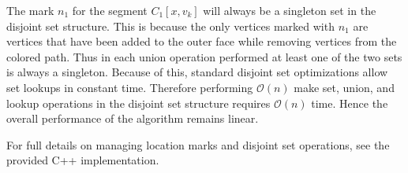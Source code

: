\documentclass[letterpaper, 12pt]{article}
\theoremstyle{definition}
\theoremstyle{definition}
\theoremstyle{thm}
\theoremstyle{definition}
\begin{document}
The mark $n_1$ for the segment $C_1[x,v_k]$ will always be a singleton set in the
disjoint set structure. This is because the only vertices marked with $n_1$ are
vertices that have been added to the outer face while removing vertices from the
colored path. Thus in each union operation performed at least one of the two sets
is always a singleton. Because of this, standard disjoint set optimizations
allow set lookups in constant time. Therefore performing
$\mathcal{O}(n)$ make set, union, and lookup operations in the disjoint set
structure requires $\mathcal{O}(n)$ time. Hence the overall performance of the
algorithm remains linear.

For full details on managing location marks and disjoint set operations, see the
provided C++ implementation.

\begin{comment}

\begin{figure}
\begin{tikzpicture}[scale=0.7]
	\node (1) [label=left:{$1,2$}] at (-3.0cm, 1.0cm) {};
	\node (2) [label=above left:{$1,3$}] at (-1.5cm, 2.0cm) {};
	\node (3) [label=above:{$1,4$}] at (0.0cm, 2.0cm) {};
	\node (4) [label=above right:{$1,3$}] at (1.5cm, 2.0cm) {};
	\node (5) [label=right:{$1,2$}] at (3.0cm, 1.0cm) {};
	\node (6) [label=right:{$1,4$}] at (3.0cm, -1.0cm) {};
	\node (7) [label=below:{$3,4$}] at (1.5cm, -2.0cm) {};
	\node (8) [label=below:{$2 \ y$}] at (0.0cm, -2.0cm) {};
	\node (9) [label=below:{$1,3$}] at (-1.5cm, -2.0cm) {};
	\node (10) [label=left:{$1 \ x$}, ultra thick, fill=white] at (-3.0cm, -1.0cm) {};
	\node (11) [label=right:{$1,2,3$}] at (-1.6cm, 0.4cm) {};
	\node (12) [label=left:{$1,3,4$}] at (1.6cm, -0.8cm) {};
	
	\draw (1) edge (2); \draw (2) edge (3); \draw (3) edge (4);
	\draw (4) edge (5); \draw (5) edge (6); \draw (6) edge (7);
	\draw (7) edge (8); \draw (8) edge (9); \draw (9) edge (10) [ultra thick];
	\draw (10) edge (1);
	
	\draw (2) edge (11); \draw (3) edge (11); \draw (3) edge (6);
	\draw (4) edge (6); \draw (3) edge (8); \draw (7) edge (12);
	\draw (8) edge (11); \draw (9) edge (11); \draw (10) edge (11);
	\draw (10) edge (2); \draw (3) edge (12); \draw (6) edge (12);
	\draw (8) edge (12);
\end{tikzpicture}
\begin{tikzpicture}[scale=0.7]
	\node (1) [label=left:{$1,2$}] at (-3.0cm, 1.0cm) {};
	\node (2) [label=above left:{$1,3$}] at (-1.5cm, 2.0cm) {};
	\node (3) [label=above:{$1,4$}] at (0.0cm, 2.0cm) {};
	\node (4) [label=above right:{$1,3$}] at (1.5cm, 2.0cm) {};
	\node (5) [label=right:{$1,2$}] at (3.0cm, 1.0cm) {};
	\node (6) [label=right:{$1,4$}] at (3.0cm, -1.0cm) {};
	\node (7) [label=below:{$3,4$}] at (1.5cm, -2.0cm) {};
	\node (8) [label=below:{$2 \ y$}] at (0.0cm, -2.0cm) {};
	\node (9) [label=below:{$1,3$}] at (-1.5cm, -2.0cm) {};
	\node (10) [label=left:{$1 \ x$}, ultra thick, fill=white] at (-3.0cm, -1.0cm) {};
	\node (11) [label=right:{$1,2,3$}] at (-1.6cm, 0.4cm) {};
	\node (12) [label=left:{$1,3,4$}] at (1.6cm, -0.8cm) {};
	

\end{comment}
\end{document}
